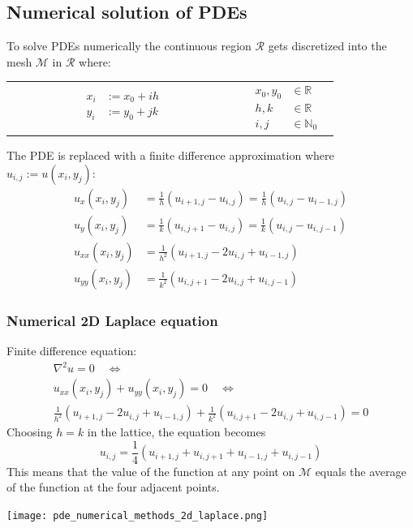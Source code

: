 \subsection{Numerical solution of PDEs}

To solve PDEs numerically the continuous region $\mathcal{R}$ gets discretized into the mesh $\mathcal{M}$ in $\mathcal{R}$ where:

\begin{tabular}{ m{0.6\linewidth}  m{0.2\linewidth} }
    {
        \begin{align*}
            x_i & := x_0 + ih \\
            y_i & := y_0 + jk \\
        \end{align*}
    }
     &
    {
            \begin{align*}
                x_0, y_0 & \in \mathbb{R}   \\
                h, k     & \in \mathbb{R}   \\
                i, j     & \in \mathbb{N}_0
            \end{align*}
        }
\end{tabular}

The PDE is replaced with a finite difference approximation where $u_{i,j}:=u(x_i,y_j)$:
\begin{align*}
    u_{x}(x_i,y_j)  & = \frac1h(u_{i+1,j}-u_{i,j})=\frac1h(u_{i,j}-u_{i-1,j})         \\
    u_{y}(x_i,y_j)  & = \frac{1}{k}(u_{i,j+1}-u_{i,j})=\frac{1}{k}(u_{i,j}-u_{i,j-1}) \\
    u_{xx}(x_i,y_j) & = \frac{1}{h^{2}}(u_{i+1,j}-2u_{i,j}+u_{i-1,j})                 \\
    u_{yy}(x_i,y_j) & = \frac{1}{k^{2}}(u_{i,j+1}-2u_{i,j}+u_{i,j-1})
\end{align*}

\subsubsection{Numerical 2D Laplace equation}
Finite difference equation:
\begin{gather*}
    \nabla^2 u = 0 \quad \Leftrightarrow \\
    u_{xx}(x_i,y_j) + u_{yy}(x_i,y_j) = 0 \quad \Leftrightarrow \\
    \frac{1}{h^2}(u_{i+1,j}-2u_{i,j}+u_{i-1,j})+\frac{1}{k^2}(u_{i,j+1}-2u_{i,j}+u_{i,j-1})=0
\end{gather*}
Choosing $h=k$ in the lattice, the equation becomes
\begin{equation*}
    u_{i,j}=\frac14(u_{i+1,j}+u_{i,j+1}+u_{i-1,j}+u_{i,j-1})
\end{equation*}
This means that the value of the function at any point on $\mathcal{M}$ equals the average of the function at the four adjacent points.
\begin{center}
    \texttt{[image: pde\_numerical\_methods\_2d\_laplace.png]}
\end{center}

